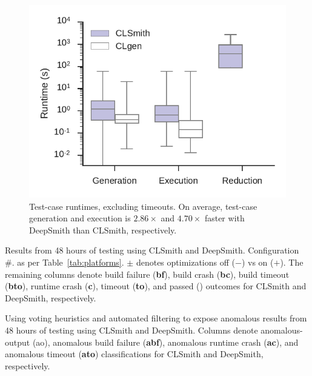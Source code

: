 \begin{figure}
	\centering %
	\includegraphics[width=\columnwidth]{build/img/runtimes}%
	\caption{%
		Test-case runtimes, excluding timeouts. On average, test-case generation and execution is $2.86\times$ and $4.70\times$ faster with DeepSmith than CLSmith, respectively. %
	}%
	\label{fig:runtimes} %
\end{figure}


\begin{table}
	\scriptsize %
	\centering %
	
	\caption{Results from 48 hours of testing using CLSmith and DeepSmith. Configuration \#. as per Table~\ref{tab:platforms}. $\pm$ denotes optimizations off ($-$) vs on ($+$). The remaining columns denote build failure (\textbf{bf}), build crash (\textbf{bc}), build timeout (\textbf{bto}), runtime crash (\textbf{c}), timeout (\textbf{to}), and passed (\textbf{\cmark}) outcomes for CLSmith and DeepSmith, respectively.}
	\label{tab:outcomes}
\end{table}

\begin{table}
	\scriptsize %
	\centering %
	
	\caption{Using voting heuristics and automated filtering to expose anomalous results from 48 hours of testing using CLSmith and DeepSmith. Columns denote anomalous-output (ao), anomalous build failure (\textbf{abf}), anomalous runtime crash (\textbf{ac}), and anomalous timeout (\textbf{ato}) classifications for CLSmith and DeepSmith, respectively.}
	\label{tab:classifications}
\end{table}


